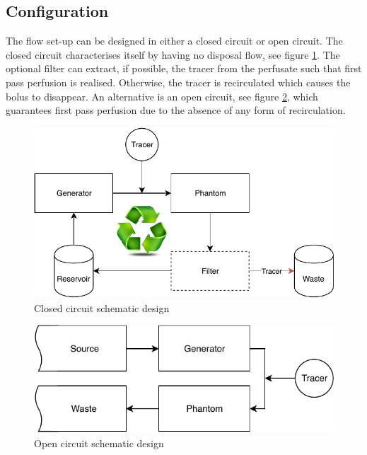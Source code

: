 \subsection*{Configuration}
\label{sec:config}
The flow set-up can be designed in either a closed circuit or open circuit. The closed circuit characterises itself by having no disposal flow, see figure \ref{fig:closed_circ}. The optional filter can extract, if possible, the tracer from the perfusate such that first pass perfusion is realised. Otherwise, the tracer is recirculated which causes the bolus to disappear. An alternative is an open circuit, see figure \ref{fig:open_circ}, which guarantees first pass perfusion due to the absence of any form of recirculation.
\begin{minipage}{0.5\textwidth}
\begin{figure}[H]
	\includegraphics[width=\linewidth]{./images/concept_design_closedCircuit.pdf}
	\caption{Closed circuit schematic design}
	\label{fig:closed_circ}
\end{figure}
\end{minipage}%
\begin{minipage}{0.5\textwidth}
\begin{figure}[H]
	\includegraphics[width=\linewidth]{./images/concept_design_openCircuit.pdf}
	\caption{Open circuit schematic design}
	\label{fig:open_circ}
\end{figure}
\end{minipage}
